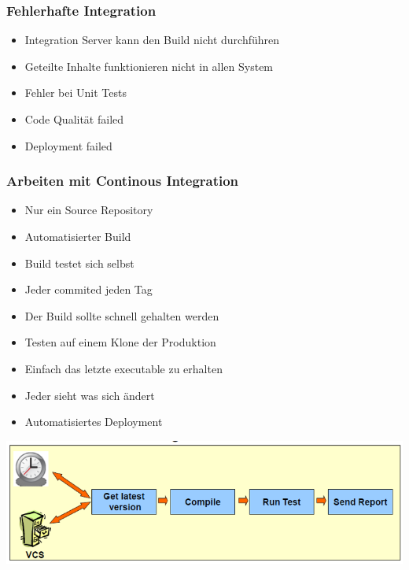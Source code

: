 \documentclass[10pt]{article}
\begin{document}
    \subsubsection{Fehlerhafte Integration}
    \begin{itemize}
        \item Integration Server kann den Build nicht durchf\"uhren
        \item Geteilte Inhalte funktionieren nicht in allen System
        \item Fehler bei Unit Tests
        \item Code Qualit\"at failed
        \item Deployment failed
    \end{itemize}

    \subsubsection{Arbeiten mit Continous Integration}
    \begin{itemize}
        \item Nur ein Source Repository
        \item Automatisierter Build
        \item Build testet sich selbst
        \item Jeder commited jeden Tag
        \item Der Build sollte schnell gehalten werden
        \item Testen auf einem Klone der Produktion
        \item Einfach das letzte executable zu erhalten
        \item Jeder sieht was sich \"andert
        \item Automatisiertes Deployment
    \end{itemize}
    \begin{center}
    	\includegraphics[scale=0.6]{assets/arbeit_ci.png}
	\end{center}
\end{document}
